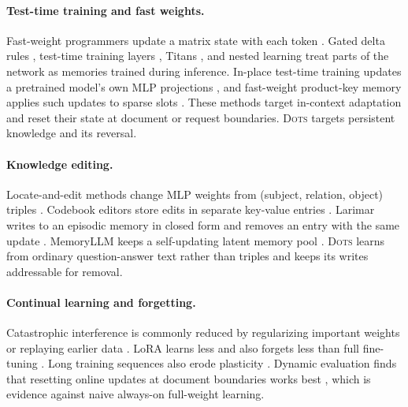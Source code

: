 \documentclass[10pt]{article}
\newcommand{\sys}{\textsc{Dots}}
\begin{document}
\paragraph{Test-time training and fast weights.} Fast-weight programmers update a matrix state with each token \citep{schlag2021linear}. Gated delta rules \citep{yang2025gated}, test-time training layers \citep{sun2024ttt}, Titans \citep{behrouz2025titans}, and nested learning \citep{behrouz2025nested} treat parts of the network as memories trained during inference. In-place test-time training updates a pretrained model's own MLP projections \citep{feng2026inplace}, and fast-weight product-key memory applies such updates to sparse slots \citep{zhao2026fwpkm}. These methods target in-context adaptation and reset their state at document or request boundaries. \sys{} targets persistent knowledge and its reversal.

\paragraph{Knowledge editing.} Locate-and-edit methods change MLP weights from (subject, relation, object) triples \citep{meng2022rome,meng2023memit,fang2025alphaedit}. Codebook editors store edits in separate key-value entries \citep{hartvigsen2023grace,wang2024wise}. Larimar writes to an episodic memory in closed form and removes an entry with the same update \citep{das2024larimar}. MemoryLLM keeps a self-updating latent memory pool \citep{wang2024memoryllm}. \sys{} learns from ordinary question-answer text rather than triples and keeps its writes addressable for removal.

\paragraph{Continual learning and forgetting.} Catastrophic interference \citep{mccloskey1989} is commonly reduced by regularizing important weights \citep{kirkpatrick2017ewc} or replaying earlier data \citep{ibrahim2024simple}. LoRA \citep{hu2022lora} learns less and also forgets less than full fine-tuning \citep{biderman2024lora}. Long training sequences also erode plasticity \citep{dohare2024loss}. Dynamic evaluation finds that resetting online updates at document boundaries works best \citep{rannentriki2024dynamic}, which is evidence against naive always-on full-weight learning.
\end{document}
